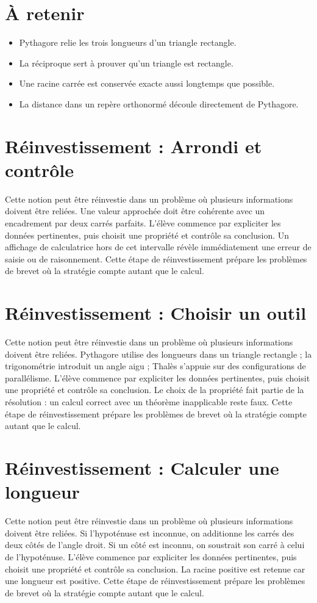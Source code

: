 \section{À retenir}
\begin{aretenir}
\begin{itemize}
\item Pythagore relie les trois longueurs d’un triangle rectangle.
\item La réciproque sert à prouver qu’un triangle est rectangle.
\item Une racine carrée est conservée exacte aussi longtemps que possible.
\item La distance dans un repère orthonormé découle directement de Pythagore.
\end{itemize}
\end{aretenir}

\section{Réinvestissement : Arrondi et contrôle}
Cette notion peut être réinvestie dans un problème où plusieurs informations doivent être reliées. Une valeur approchée doit être cohérente avec un encadrement par deux carrés parfaits. L’élève commence par expliciter les données pertinentes, puis choisit une propriété et contrôle sa conclusion. Un affichage de calculatrice hors de cet intervalle révèle immédiatement une erreur de saisie ou de raisonnement. Cette étape de réinvestissement prépare les problèmes de brevet où la stratégie compte autant que le calcul.

\section{Réinvestissement : Choisir un outil}
Cette notion peut être réinvestie dans un problème où plusieurs informations doivent être reliées. Pythagore utilise des longueurs dans un triangle rectangle ; la trigonométrie introduit un angle aigu ; Thalès s’appuie sur des configurations de parallélisme. L’élève commence par expliciter les données pertinentes, puis choisit une propriété et contrôle sa conclusion. Le choix de la propriété fait partie de la résolution : un calcul correct avec un théorème inapplicable reste faux. Cette étape de réinvestissement prépare les problèmes de brevet où la stratégie compte autant que le calcul.

\section{Réinvestissement : Calculer une longueur}
Cette notion peut être réinvestie dans un problème où plusieurs informations doivent être reliées. Si l’hypoténuse est inconnue, on additionne les carrés des deux côtés de l’angle droit. Si un côté est inconnu, on soustrait son carré à celui de l’hypoténuse. L’élève commence par expliciter les données pertinentes, puis choisit une propriété et contrôle sa conclusion. La racine positive est retenue car une longueur est positive. Cette étape de réinvestissement prépare les problèmes de brevet où la stratégie compte autant que le calcul.
